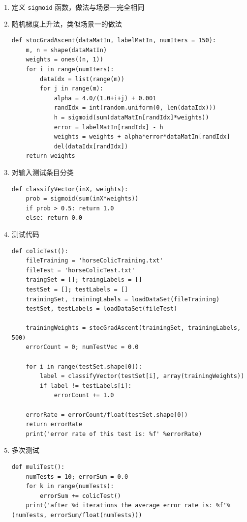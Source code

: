 \documentclass[11pt]{ctexart}
\begin{document}
\begin{enumerate}
\begin{enumerate}
\item 定义 \texttt{sigmoid} 函数，做法与场景一完全相同
\item 随机梯度上升法，类似场景一的做法
\lstset{language=Python,label= ,caption= ,captionpos=b,numbers=none}
\begin{lstlisting}
def stocGradAscent(dataMatIn, labelMatIn, numIters = 150):
    m, n = shape(dataMatIn)
    weights = ones((n, 1))
    for i in range(numIters):
        dataIdx = list(range(m))
        for j in range(m):
            alpha = 4.0/(1.0+i+j) + 0.001
            randIdx = int(random.uniform(0, len(dataIdx)))
            h = sigmoid(sum(dataMatIn[randIdx]*weights))
            error = labelMatIn[randIdx] - h
            weights = weights + alpha*error*dataMatIn[randIdx]
            del(dataIdx[randIdx])
    return weights
\end{lstlisting}

\item 对输入测试条目分类
\lstset{language=Python,label= ,caption= ,captionpos=b,numbers=none}
\begin{lstlisting}
def classifyVector(inX, weights):
    prob = sigmoid(sum(inX*weights))
    if prob > 0.5: return 1.0
    else: return 0.0
\end{lstlisting}
\item 测试代码
\lstset{language=Python,label= ,caption= ,captionpos=b,numbers=none}
\begin{lstlisting}
def colicTest():
    fileTraining = 'horseColicTraining.txt'
    fileTest = 'horseColicTest.txt'
    traingSet = []; traingLabels = []
    testSet = []; testLabels = []
    trainingSet, trainingLabels = loadDataSet(fileTraining)
    testSet, testLabels = loadDataSet(fileTest)

    trainingWeights = stocGradAscent(trainingSet, trainingLabels, 500)
    errorCount = 0; numTestVec = 0.0

    for i in range(testSet.shape[0]):
        label = classifyVector(testSet[i], array(trainingWeights))
        if label != testLabels[i]:
            errorCount += 1.0

    errorRate = errorCount/float(testSet.shape[0])
    return errorRate
    print('error rate of this test is: %f' %errorRate)
\end{lstlisting}
\item 多次测试
\lstset{language=Python,label= ,caption= ,captionpos=b,numbers=none}
\begin{lstlisting}
def muliTest():
    numTests = 10; errorSum = 0.0
    for k in range(numTests):
        errorSum += colicTest()
    print('after %d iterations the average error rate is: %f'%(numTests, errorSum/float(numTests)))
\end{lstlisting}
\end{enumerate}
\end{enumerate}
\end{document}
